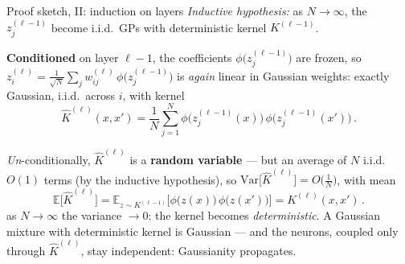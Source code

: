 \documentclass[11pt]{beamer}
\newcommand{\E}{\mathbb{E}}
\newcommand{\hl}[1]{{\color{blue!60!black}\textbf{#1}}}
\begin{document}
\begin{frame}{Proof sketch, II: induction on layers}
  \emph{Inductive hypothesis:} as $N\to\infty$, the $z^{(\ell-1)}_j$
  become i.i.d.\ GPs with deterministic kernel $K^{(\ell-1)}$. \pause

  \hl{Conditioned} on layer $\ell-1$, the coefficients
  $\phi\big(z^{(\ell-1)}_j\big)$ are frozen, so
  $z^{(\ell)}_i = \frac{1}{\sqrt N}\sum_j w^{(\ell)}_{ij}\,
  \phi\big(z^{(\ell-1)}_j\big)$ is \emph{again} linear in Gaussian
  weights: exactly Gaussian, i.i.d.\ across $i$, with kernel
  {\small
  \[
    \widehat K^{(\ell)}(x,x') = \frac{1}{N}\sum_{j=1}^{N}
    \phi\big(z^{(\ell-1)}_j(x)\big)\,\phi\big(z^{(\ell-1)}_j(x')\big)\,.
  \]} \pause
  
  \emph{Un}-conditionally, $\widehat K^{(\ell)}$ is a \hl{random
  variable} --- but an average of $N$ i.i.d.\ $O(1)$ terms (by the
  inductive hypothesis), so
  $\mathrm{Var}\big[\widehat K^{(\ell)}\big] = O\big(\tfrac1N\big)$,
  with mean
  {\small
  \[
    \E\big[\widehat K^{(\ell)}\big]
    =  \E_{z \sim K^{(\ell-1)}}
    \big[\phi\big(z(x)\big)\,\phi\big(z(x')\big)\big]
    = K^{(\ell)}(x,x')\,.
  \]} \pause
  \noindent \hl{Key:} as $N\to\infty$ the variance $\to 0$: the kernel becomes
  \emph{deterministic}. A Gaussian mixture with deterministic kernel is
  Gaussian --- and the neurons, coupled only through
  $\widehat K^{(\ell)}$, stay independent: Gaussianity propagates.
\end{frame}
\end{document}
